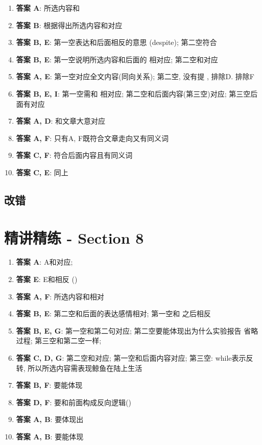   \begin{enumerate}
    \item \textbf{答案 A}: 所选内容和
    \item \textbf{答案 B}: 根据得出所选内容和对应
    \item \textbf{答案 B, E}: 第一空表达和后面相反的意思 (despite);
    第二空符合
    \item \textbf{答案 B, E}: 第一空说明所选内容和后面的
    相对应; 第二空和对应
    \item \textbf{答案 A, E}: 第一空对应全文内容(同向关系); 第二空, 没有提
    , 排除D. 排除F
    \item \textbf{答案 B, E, I}: 第一空需和
    相对应; 第二空和后面内容(第三空)对应;
    第三空后面有对应
    \item \textbf{答案 A, D}: 和文章大意对应
    \item \textbf{答案 A, F}: 只有A, F既符合文章走向又有同义词
    \item \textbf{答案 C, F}: 符合后面内容且有同义词
    \item \textbf{答案 C, E}: 同上
  \end{enumerate}

  \subsection{改错}

\section{精讲精练 - Section 8}

  \begin{enumerate}
    \item \textbf{答案 A}: A和对应;
    \item \textbf{答案 E}: E和相反 ()
    \item \textbf{答案 A, F}: 所选内容和相对
    \item \textbf{答案 B, E}: 第二空和后面的表达感情相对; 第一空和
    之后相反
    \item \textbf{答案 B, E, G}: 第一空和第二句对应; 第二空要能体现出为什么实验报告
    省略过程; 第三空和第二空一样;
    \item \textbf{答案 C, D, G}: 第二空和对应; 第一空和后面内容对应;
    第三空: while表示反转, 所以所选内容需表现鲸鱼在陆上生活
    \item \textbf{答案 B, F}: 要能体现
    \item \textbf{答案 D, F}: 要和前面构成反向逻辑()
    \item \textbf{答案 A, B}: 要体现出
    \item \textbf{答案 A, B}: 要能体现
  \end{enumerate}

